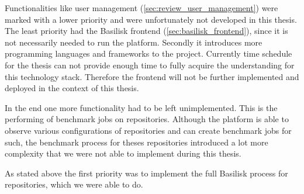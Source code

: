 Functionalities like user management (\ref{sec:review_user_management}) were marked with a lower priority and were unfortunately not developed in this thesis.
The least priority had the Basilisk frontend (\ref{sec:basilisk_frontend}), since it is not necessarily needed to run the platform.
Secondly it introduces more programming languages and frameworks to the project.
Currently time schedule for the thesis can not provide enough time to fully acquire the understanding for this technology stack.
Therefore the frontend will not be further implemented and deployed in the context of this thesis.

In the end one more functionality had to be left unimplemented.
This is the performing of benchmark jobs on \gh{} repositories.
Although the platform is able to observe various configurations of \gh{} repositories and can create benchmark jobs for such, the benchmark process for theses repositories introduced a lot more complexity that we were not able to implement during this thesis.

As stated above the first priority was to implement the full Basilisk process for \dockh{} repositories, which we were able to do.









	